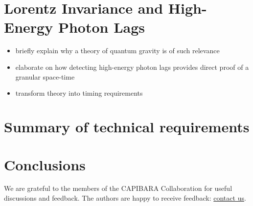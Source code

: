 \documentclass[
    aps,
    prd,
    twocolumn,
    nofootinbib,
    floatfix,
    superscriptaddress
]{revtex4-2}
\begin{document}
\section{Lorentz Invariance and High-Energy Photon Lags}

\begin{itemize}
	\item briefly explain why a theory of quantum gravity is of such relevance
	\item elaborate on how detecting high-energy photon lags provides direct proof of a granular space-time
	\item transform theory into timing requirements
\end{itemize}


\section{Summary of technical requirements}



\section{Conclusions}


\begin{acknowledgments}
	We are grateful to the members of the CAPIBARA Collaboration for useful discussions and feedback. The authors are happy to receive feedback: \href{https://capibara3.github.io/contact.html}{contact us}.
\end{acknowledgments}



\end{document}
